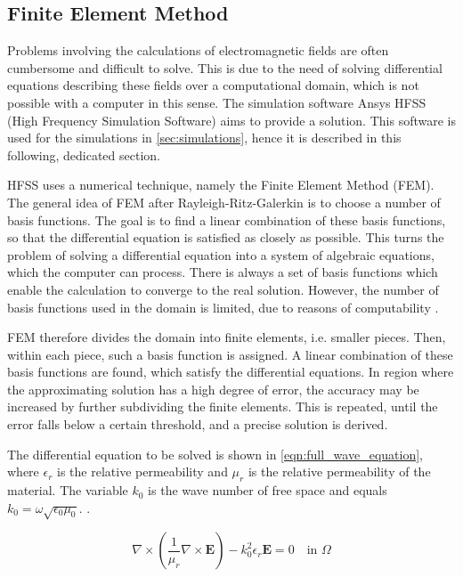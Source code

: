 \subsection{Finite Element Method}

Problems involving the calculations of electromagnetic fields are often cumbersome and difficult to solve. This is due to the need of solving differential equations describing these fields over a computational domain, which is not possible with a computer in this sense. The simulation software Ansys HFSS (High Frequency Simulation Software) aims to provide a solution. This software is used for the simulations in \autoref{sec:simulations}, hence it is described in this following, dedicated section.

HFSS uses a numerical technique, namely the Finite Element Method (FEM). The general idea of FEM after Rayleigh-Ritz-Galerkin is to choose a number of basis functions. The goal is to find a linear combination of these basis functions, so that the differential equation is satisfied as closely as possible. This turns the problem of solving a differential equation into a system of algebraic equations, which the computer can process. There is always a set of basis functions which enable the calculation to converge to the real solution. However, the number of basis functions used in the domain is limited, due to reasons of computability \cite{STRANG_2018}. 

FEM therefore divides the domain into finite elements, i.e. smaller pieces. Then, within each piece, such a basis function is assigned. A linear combination of these basis functions are found, which satisfy the differential equations. In region where the approximating solution has a high degree of error, the accuracy may be increased by further subdividing the finite elements. This is repeated, until the error falls below a certain threshold, and a precise solution is derived.

The differential equation to be solved is shown in \autoref{eqn:full_wave_equation}, where $\epsilon_r$ is the relative permeability and $\mu_r$ is the relative permeability of the material. The variable $k_0$ is the wave number of free space and equals $k_0=\omega\sqrt{\epsilon_0\mu_0}$. \cite{Cendes_Lee_1988,85399,Cendes_1991}.

\begin{equation}
    \nabla\times\left(\frac{1}{\mu_r}\nabla\times\mathbf{E}\right)-k_0^2\epsilon_r\mathbf{E}=0 \quad\text{in $\Omega$}
    \label{eqn:full_wave_equation}
\end{equation}

